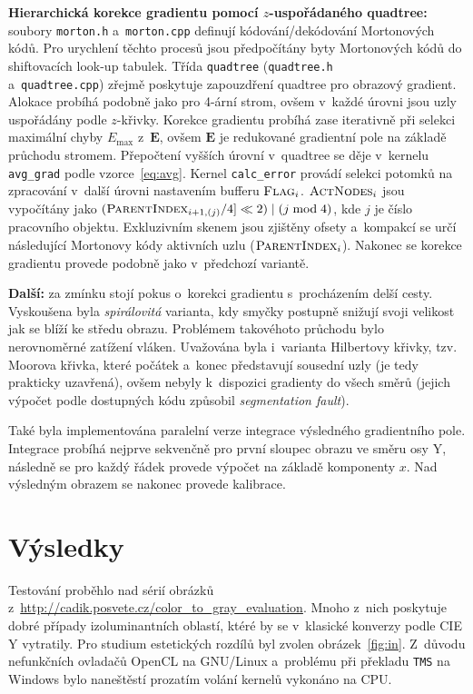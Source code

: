 \documentclass[11pt,a4paper,oneside]{article}
\begin{document}
	\textbf{Hierarchická korekce gradientu pomocí $z$-uspořádaného quadtree:} \;
	soubory \texttt{morton.h} a~\texttt{morton.cpp} definují kódování/dekódování Mortonových kódů.
	Pro urychlení těchto procesů jsou předpočítány byty Mortonových kódů do shiftovacích look-up
	tabulek. Třída \texttt{quadtree} (\texttt{quadtree.h} \\ a~\texttt{quadtree.cpp})
	zřejmě poskytuje zapouzdření quadtree pro obrazový gradient. Alokace probíhá podobně jako pro 4-ární
	strom, ovšem v~každé úrovni jsou uzly uspořádány podle $z$-křivky. Korekce gradientu
	probíhá zase iterativně při selekci maximální chyby $E_{\max}$ z~$\textbf{E}$, ovšem
	$\textbf{E}$ je redukované gradientní pole na základě průchodu stromem. Přepočtení vyšších
	úrovní v~quadtree se děje v~kernelu \texttt{avg\_grad} podle vzorce~\eqref{eq:avg}.
	Kernel \texttt{calc\_error} provádí selekci potomků na zpracování v~další úrovni
	nastavením bufferu $\textsc{Flag}_i$. $\textsc{ActNodes}_i$ jsou vypočítány jako
	$ (\textsc{ParentIndex}_{i + 1, (j)} / 4] \ll 2) \mid (j \bmod 4)$, kde $j$ je číslo
	pracovního objektu. Exkluzivním skenem jsou zjištěny ofsety a~kompakcí se určí následující
	Mortonovy kódy aktivních uzlu ($\textsc{ParentIndex}_i$). Nakonec se korekce gradientu provede
	podobně jako v~předchozí variantě.

	\textbf{Další:} \; za zmínku stojí pokus o~korekci gradientu s~procházením delší cesty.
	Vyskoušena byla \emph{spirálovitá} varianta, kdy smyčky postupně snižují svoji velikost
	jak se blíží ke středu obrazu. Problémem takovéhoto průchodu bylo nerovnoměrné zatížení vláken.
	Uvažována byla i~varianta Hilbertovy křivky, tzv. Moorova křivka, které počátek a~konec
	představují sousední uzly (je tedy prakticky uzavřená), ovšem nebyly k~dispozici gradienty
	do všech směrů (jejich výpočet podle dostupných kódu způsobil \emph{segmentation fault}).

	Také byla implementována paralelní verze integrace výsledného gradientního pole. Integrace
	probíhá nejprve sekvenčně pro první sloupec obrazu ve směru osy Y, následně se pro
	každý řádek provede výpočet na základě komponenty $x$. Nad výsledným obrazem
	se nakonec provede kalibrace.

	\section{Výsledky}
	Testování proběhlo nad sérií obrázků z~\url{http://cadik.posvete.cz/color_to_gray_evaluation}.
	Mnoho z~nich poskytuje dobré případy izoluminantních oblastí, ktéré by se v~klasické konverzy
	podle CIE Y vytratily. Pro studium estetických rozdílů byl zvolen obrázek~\ref{fig:in}.
	Z~důvodu nefunkčních ovladačů OpenCL na GNU/Linux a~problému při překladu \texttt{TMS}
	na Windows bylo naneštěstí prozatím volání kernelů vykonáno na CPU.
\end{document}
